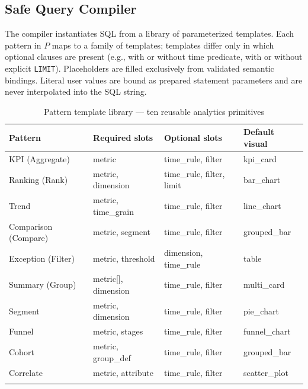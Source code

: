 \documentclass[11pt]{article}
\begin{document}
\subsection{Safe Query Compiler\label{sec:compiler}}
The compiler instantiates SQL from a library of parameterized templates. Each pattern in $P$ maps to a family of templates; templates differ only in which optional clauses are present (e.g., with or without time predicate, with or without explicit \texttt{LIMIT}). Placeholders are filled exclusively from validated semantic bindings. Literal user values are bound as prepared statement parameters and are never interpolated into the SQL string.

\begin{longtable}{llll}
\toprule
\textbf{Pattern} & \textbf{Required slots} & \textbf{Optional slots} & \textbf{Default visual}\\
\midrule
KPI (Aggregate) & metric & time\_rule, filter & kpi\_card\\
Ranking (Rank) & metric, dimension & time\_rule, filter, limit & bar\_chart\\
Trend & metric, time\_grain & time\_rule, filter & line\_chart\\
Comparison (Compare) & metric, segment & time\_rule, filter & grouped\_bar\\
Exception (Filter) & metric, threshold & dimension, time\_rule & table\\
Summary (Group) & metric[], dimension & time\_rule, filter & multi\_card\\
Segment & metric, dimension & time\_rule, filter & pie\_chart\\
Funnel & metric, stages & time\_rule, filter & funnel\_chart\\
Cohort & metric, group\_def & time\_rule, filter & grouped\_bar\\
Correlate & metric, attribute & time\_rule, filter & scatter\_plot\\
\bottomrule
\caption{Pattern template library --- ten reusable analytics primitives}\label{tab:patterns}
\end{longtable}
\end{document}
